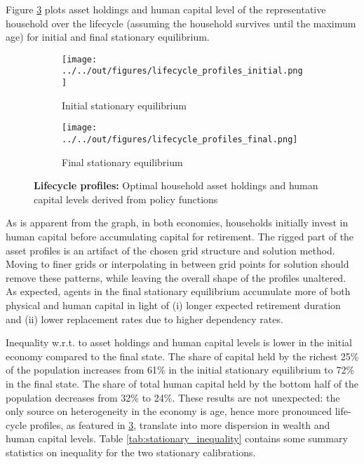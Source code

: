 Figure \ref{fig:lifecycle_profiles} plots asset holdings and human capital level of the representative household over the lifecycle (assuming the household survives until the maximum age) for initial and final stationary equilibrium.

\begin{figure}[ht]
    \centering
    \begin{subfigure}[b]{0.45\textwidth}
        \centering
        \texttt{[image: ../../out/figures/lifecycle\_profiles\_initial.png]}
        \caption{Initial stationary equilibrium}
        \label{fig:lifecycle_profiles_initial}
    \end{subfigure}
    \hfill
    \begin{subfigure}[b]{0.45\textwidth}
        \centering
        \texttt{[image: ../../out/figures/lifecycle\_profiles\_final.png]}
        \caption{Final stationary equilibrium}
        \label{fig:lifecycle_profiles_final}
    \end{subfigure}
    \caption{\textbf{Lifecycle profiles:} Optimal household asset holdings and human capital levels derived from policy functions}
    \label{fig:lifecycle_profiles}
\end{figure}

As is apparent from the graph, in both economies, households initially invest in human capital before accumulating capital for retirement. The rigged part of the asset profiles is an artifact of the chosen grid structure and solution method. Moving to finer grids or interpolating in between grid points for solution should remove these patterns, while leaving the overall shape of the profiles unaltered. As expected, agents in the final stationary equilibrium accumulate more of both physical and human capital in light of (i) longer expected retirement duration and (ii) lower replacement rates due to higher dependency rates.

Inequality w.r.t. to asset holdings and human capital levels is lower in the initial economy compared to the final state. The share of capital held by the richest 25\% of the population increases from 61\% in the initial stationary equilibrium to 72\% in the final state. The share of total human capital held by the bottom half of the population decreases from 32\% to 24\%. These results are not unexpected: the only source on heterogeneity in the economy is age, hence more pronounced life-cycle profiles, as featured in \ref{fig:lifecycle_profiles}, translate into more dispersion in wealth and human capital levels. Table \ref{tab:stationary_inequality} contains some summary statistics on inequality for the two stationary calibrations.

